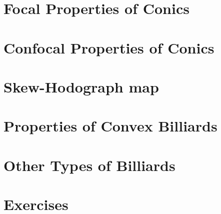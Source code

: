 \section{Focal Properties of Conics}
\label{sec:08-focal}


\section{Confocal Properties of Conics}
\label{sec:08-confocal}


\section{Skew-Hodograph map}
\label{sec:08-hodograph}


\section{Properties of Convex Billiards}
\label{sec:08-convex_billiard}


\section{Other Types of Billiards}
\label{sec:08-other-billiards}


\section{Exercises}
\label{sec:08-exercises}



